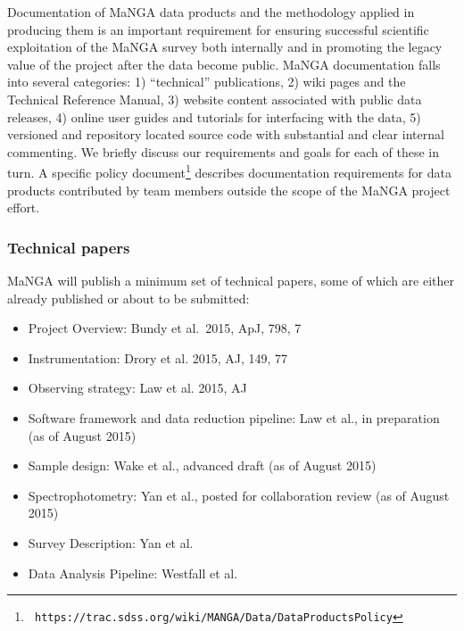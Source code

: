 \documentclass[preprint,11pt]{aastex}
\begin{document}
Documentation of MaNGA data products and the methodology applied in producing them is an important requirement for ensuring
successful scientific exploitation of the MaNGA survey both internally and in promoting the legacy value of the project after the
data become public.  MaNGA documentation falls into several categories: 1) ``technical'' publications, 2) wiki pages and the
Technical Reference Manual, 3) website content associated with public data releases, 4) online user guides and tutorials for
interfacing with the data, 5) versioned and repository located source code with substantial and clear internal commenting.  We
briefly discuss our requirements and goals for each of these in turn.  A specific policy document\footnote{{\tt
    https://trac.sdss.org/wiki/MANGA/Data/DataProductsPolicy}} describes documentation requirements for data products contributed
by team members outside the scope of the MaNGA project effort.

\subsubsection{Technical papers}

MaNGA will publish a minimum set of technical papers, some of which are either already published or about to be submitted:

\begin{itemize}

\item Project Overview: ​Bundy et al.~2015, ApJ, 798, 7

\item Instrumentation: Drory et al. 2015, AJ, 149, 77

\item Observing strategy: Law et al. 2015, AJ

\item Software framework and data reduction pipeline: Law et al., in preparation (as of August 2015)

\item Sample design: Wake et al., advanced draft (as of August 2015)

\item Spectrophotometry: Yan et al., posted for collaboration review (as of August 2015)

\item Survey Description: Yan et al.

\item Data Analysis Pipeline: Westfall et al.

\end{itemize}
\end{document}
